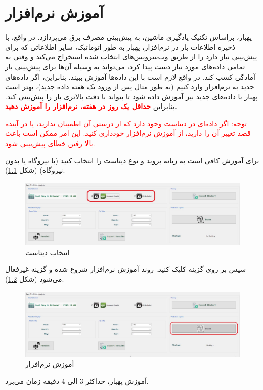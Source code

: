 \documentclass[a4paper,20pt,dvipsnames, usenames]{extbook}
\begin{document}
\chapter{آموزش نرم‌افزار}
پهبار،‌ براساس تکنیک یادگیری ماشین، به پیش‌بینی مصرف برق می‌پردازد. در واقع، با ذخیره اطلاعات بار در نرم‌افزار،‌ پهبار به طور اتوماتیک، سایر اطلاعاتی که برای پیش‌بینی نیاز دارد را از طریق وب‌سرویس‌های انتخاب شده استخراج می‌کند و وقتی به تمامی داده‌های مورد نیاز دست پیدا کرد، می‌تواند به وسیله آن‌ها برای پیش‌بینی بار آمادگی کسب کند. در واقع لازم است با این داده‌ها آموزش ببیند. بنابراین، اگر داده‌های جدید به نرم‌افزار وارد کنیم (به طور مثال پس از ورود یک هفته داده جدید)،‌ بهتر است پهبار با داده‌های جدید نیز آموزش داده شود تا بتواند با دقت بالاتری بار را پیش‌بینی کند. بنابراین 
\textbf{\underline{\textcolor{red}{حداقل یک روز در هفته،‌ نرم‌افزار را آموزش دهید}}.}

\textcolor{red}{توجه: اگر داده‌ای در دیتاست وجود دارد که از درستی آن اطمینان ندارید، یا در آینده قصد تغییر آن را دارید، از آموزش نرم‌افزار خودداری کنید. این امر ممکن است باعث بالا رفتن خطای پیش‌بینی شود.}
 

برای آموزش کافی است به زبانه 
بروید و نوع دیتاست را انتخاب کنید (با نیروگاه یا بدون نیروگاه) (شکل
\ref{fig12}).
\begin{figure}[!h]
	\centering
	\includegraphics[width = \textwidth]{fig35}
	\caption{انتخاب دیتاست}
	\label{fig12}
\end{figure}

سپس بر روی گزینه 
کلیک کنید. روند آموزش نرم‌افزار شروع شده و گزینه
غیرفعال می‌شود (شکل
\ref{fig13}). 
\begin{figure}[!h]
	\centering
	\includegraphics[width = \textwidth]{fig25}
	\caption{آموزش نرم‌افزار}
	\label{fig13}
\end{figure}
آموزش پهبار، حداکثر 3 الی 4 دقیقه زمان می‌برد. 
\end{document}
